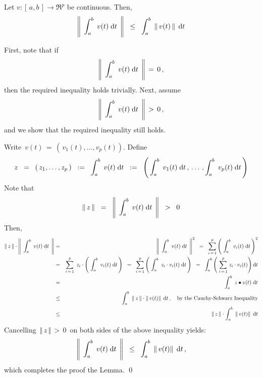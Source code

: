 
\begin{lemma}\label{vectorNormOfIntegralLessThanInteralOfNorm}
\mbox{}
\vskip 0.1cm
\noindent
Let $v : [\,a,b\,] \longrightarrow \Re^{p}$ be continuous.
Then,
\begin{equation*}
\left\Vert\;\, \int_{a}^{b}\; v(t) \;\textnormal{d} t \,\;\right\Vert
\;\; \leq \;\;
	\int_{a}^{b}\; \left\Vert\, v(t) \,\right\Vert \;\textnormal{d} t
\end{equation*}
\end{lemma}
\proof
First, note that if
\begin{equation*}
\left\Vert\;\, \int_{a}^{b}\; v(t) \;\textnormal{d} t \,\;\right\Vert \, = \, 0\,,
\end{equation*}
then the required inequality holds trivially.
Next, assume
\begin{equation*}
\left\Vert\;\, \int_{a}^{b}\; v(t) \;\textnormal{d} t \,\;\right\Vert \, > \, 0\,,
\end{equation*}
and we show that the required inequality still holds.

\vskip 0.5cm
\noindent
Write \,$v(t) \,=\, \left(\,v_{1}(t),\ldots,v_{p}(t)\right)$.
Define
\begin{equation*}
z
\;\; = \;\;
	(\,z_{1},\ldots,z_{p}\,)
\;\; := \;\;
	\int_{a}^{b}\; v(t) \;\textnormal{d} t
\;\; := \;\;
	\left(\,
		\int_{a}^{b}\; v_{1}(t) \;\textnormal{d} t\,,
		\,\ldots\,,
		\int_{a}^{b}\; v_{p}(t) \;\textnormal{d} t
		\,\right)
\end{equation*}
Note that
\begin{equation*}
\Vert\, z \,\Vert
\;\; = \;\;
	\left\Vert\;\, \int_{a}^{b}\; v(t) \;\textnormal{d} t \,\;\right\Vert
\;\; > \;\;
	0
\end{equation*}
Then,
\begin{eqnarray*}
\Vert\, z \,\Vert \cdot \left\Vert\;\, \int_{a}^{b}\; v(t) \;\textnormal{d} t \,\;\right\Vert
& = &
	\left\Vert\;\, \int_{a}^{b}\; v(t) \;\textnormal{d} t \,\;\right\Vert^{2}
\;\; = \;\;
	\overset{p}{\underset{i\,=\,1}{\sum}}
	\left(\;
		\int_{a}^{b}\; v_{i}(t) \;\textnormal{d} t
		\,\right)^{2}
\\
& = &
	\overset{p}{\underset{i\,=\,1}{\sum}}\;\,
	z_{i} \cdot \left(\; \int_{a}^{b}\; v_{i}(t) \;\textnormal{d} t \,\right)
\;\; = \;\;
	\overset{p}{\underset{i\,=\,1}{\sum}}
	\left(\; \int_{a}^{b}\; z_{i} \cdot v_{i}(t) \;\textnormal{d} t \,\right)
\;\; = \;\;
	\int_{a}^{b}
		\left(\;
			\overset{p}{\underset{i\,=\,1}{\sum}}\;
			z_{i} \cdot v_{i}(t)
			\right)
		\textnormal{d} t
\\
& = &
	\int_{a}^{b}\; z \bullet v(t) \;\textnormal{d} t
\\
& \leq &
	\int_{a}^{b}\; \Vert\,z\,\Vert \cdot \Vert\,v(t)\Vert \,\;\textnormal{d} t\,,
	\quad
	\textnormal{by the Cauchy-Schwarz Inequality}
\\
& \leq &
	\Vert\,z\,\Vert \cdot \int_{a}^{b}\; \Vert\,v(t)\Vert \,\;\textnormal{d} t
\end{eqnarray*}
Cancelling \,$\Vert\,z\,\Vert \,>\, 0$\, on both sides of the above inequality yields:
\begin{equation*}
\left\Vert\;\, \int_{a}^{b}\; v(t) \;\textnormal{d} t \,\;\right\Vert
\;\; \leq \;\;
	\int_{a}^{b}\; \Vert\,v(t)\Vert \,\;\textnormal{d} t\,,
\end{equation*}
which completes the proof the Lemma.
\qed

